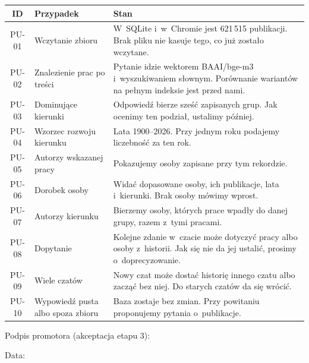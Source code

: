 \documentclass[11pt,a4paper]{article}
\begin{document}
\begin{center}
\begin{tabularx}{\textwidth}{|c|L{0.28\textwidth}|Y|}
\hline
\textbf{ID} & \textbf{Przypadek} & \textbf{Stan} \\
\hline
PU-01 & Wczytanie zbioru &
W~SQLite i~w~Chromie jest 621\,515 publikacji. Brak pliku nie kasuje tego, co już zostało wczytane. \\
\hline
PU-02 & Znalezienie prac po treści &
Pytanie idzie wektorem BAAI/bge-m3 i~wyszukiwaniem słownym. Porównanie wariantów na pełnym indeksie jest przed nami. \\
\hline
PU-03 & Dominujące kierunki &
Odpowiedź bierze sześć zapisanych grup. Jak ocenimy ten podział, ustalimy później. \\
\hline
PU-04 & Wzorzec rozwoju kierunku &
Lata 1900--2026. Przy jednym roku podajemy liczebność za ten rok. \\
\hline
PU-05 & Autorzy wskazanej pracy &
Pokazujemy osoby zapisane przy tym rekordzie. \\
\hline
PU-06 & Dorobek osoby &
Widać dopasowane osoby, ich publikacje, lata i~kierunki. Brak osoby mówimy wprost. \\
\hline
PU-07 & Autorzy kierunku &
Bierzemy osoby, których prace wpadły do danej grupy, razem z~tymi pracami. \\
\hline
PU-08 & Dopytanie &
Kolejne zdanie w~czacie może dotyczyć pracy albo osoby z~historii. Jak się nie da jej ustalić, prosimy o~doprecyzowanie. \\
\hline
PU-09 & Wiele czatów &
Nowy czat może dostać historię innego czatu albo zacząć bez niej. Do starych czatów da się wrócić. \\
\hline
PU-10 & Wypowiedź pusta albo spoza zbioru &
Baza zostaje bez zmian. Przy powitaniu proponujemy pytania o~publikacje. \\
\hline
\end{tabularx}
\end{center}

\vspace{1.2em}
Podpis promotora (akceptacja etapu 3): \dotfill

\vspace{0.8em}
Data: \dotfill
\end{document}
